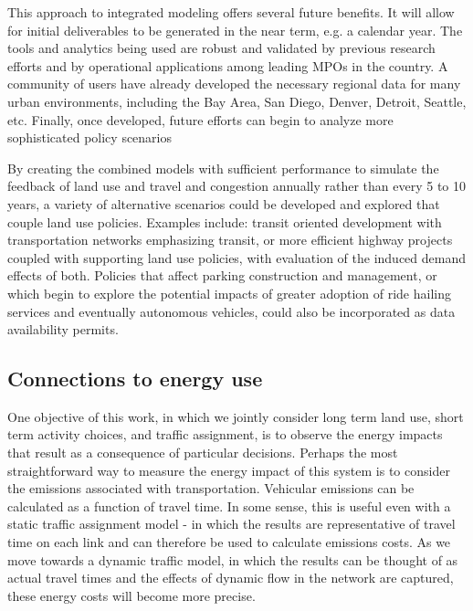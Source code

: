 This approach to integrated modeling offers several future benefits. It will allow for initial deliverables to be generated in the near term, e.g. a calendar year. The tools and analytics being used are robust and validated by previous research efforts and by operational applications among leading MPOs in the country. A community of users have already developed the necessary regional data for many urban environments, including the Bay Area, San Diego, Denver, Detroit, Seattle, etc. Finally, once developed, future efforts can begin to analyze more sophisticated policy scenarios

By creating the combined models with sufficient performance to simulate the feedback of land use and travel and congestion annually rather than every 5 to 10 years, a variety of alternative scenarios could be developed and explored that couple land use policies. Examples include: transit oriented development with transportation networks emphasizing transit, or more efficient highway projects coupled with supporting land use policies, with evaluation of the induced demand effects of both. Policies that affect parking construction and management, or which begin to explore the potential impacts of greater adoption of ride hailing services and eventually autonomous vehicles, could also be incorporated as data availability permits.

\subsection{Connections to energy use}

One objective of this work, in which we jointly consider long term land use, short term activity choices, and traffic assignment, is to observe the energy impacts that result as a consequence of particular decisions. Perhaps the most straightforward way to measure the energy impact of this system is to consider the emissions associated with transportation. Vehicular emissions can be calculated as a function of travel time. In some sense, this is useful even with a static traffic assignment model - in which the results are representative of travel time on each link and can therefore be used to calculate emissions costs. As we move towards a dynamic traffic model, in which the results can be thought of as actual travel times and the effects of dynamic flow in the network are captured, these energy costs will become more precise. 

